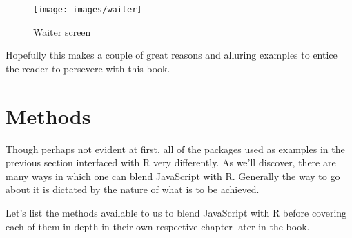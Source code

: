\documentclass[10pt,]{krantz}
\makeatletter
\newenvironment{Shaded}{\begin{snugshade}}{\end{snugshade}}
\newcommand{\CommentTok}[1]{\textcolor[rgb]{0.37,0.37,0.37}{\textit{#1}}}
\newcommand{\ControlFlowTok}[1]{\textcolor[rgb]{0.27,0.27,0.27}{\textbf{#1}}}
\newcommand{\DecValTok}[1]{\textcolor[rgb]{0.06,0.06,0.06}{#1}}
\newcommand{\KeywordTok}[1]{\textcolor[rgb]{0.27,0.27,0.27}{\textbf{#1}}}
\newcommand{\NormalTok}[1]{#1}
\newcommand{\OperatorTok}[1]{\textcolor[rgb]{0.43,0.43,0.43}{\textbf{#1}}}
\newcommand{\StringTok}[1]{\textcolor[rgb]{0.5,0.5,0.5}{#1}}
\newenvironment{kframe}{%
\medskip{}
\setlength{\fboxsep}{.8em}
 \def\at@end@of@kframe{}%
 \ifinner\ifhmode%
  \def\at@end@of@kframe{\end{minipage}}%
  \begin{minipage}{\columnwidth}%
 \fi\fi%
 \def\FrameCommand##1{\hskip\@totalleftmargin \hskip-\fboxsep
 \colorbox{shadecolor}{##1}\hskip-\fboxsep
     \hskip-\linewidth \hskip-\@totalleftmargin \hskip\columnwidth}%
 \MakeFramed {\advance\hsize-\width
   \@totalleftmargin\z@ \linewidth\hsize
   \@setminipage}}%
 {\par\unskip\endMakeFramed%
 \at@end@of@kframe}
\renewenvironment{Shaded}{\begin{kframe}}{\end{kframe}}
\makeatother
\begin{document}
\begin{Shaded}
\end{Shaded}

\begin{figure}[H]

{\centering \texttt{[image: images/waiter]} 

}

\caption{Waiter screen}\label{fig:intro-waiter}
\end{figure}

Hopefully this makes a couple of great reasons and alluring examples to entice the reader to persevere with this book.

\hypertarget{intro-methods}{%
\section{Methods}\label{intro-methods}}

Though perhaps not evident at first, all of the packages used as examples in the previous section interfaced with R very differently. As we'll discover, there are many ways in which one can blend JavaScript with R. Generally the way to go about it is dictated by the nature of what is to be achieved.

Let's list the methods available to us to blend JavaScript with R before covering each of them in-depth in their own respective chapter later in the book.
\end{document}

